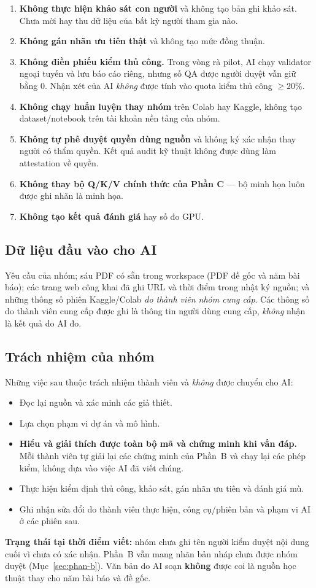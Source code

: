 \begin{enumerate}[leftmargin=2em]
\item \textbf{Không thực hiện khảo sát con người} và không tạo bản ghi khảo sát.
Chưa mời hay thu dữ liệu của bất kỳ người tham gia nào.
\item \textbf{Không gán nhãn ưu tiên thật} và không tạo mức đồng thuận.
\item \textbf{Không điền phiếu kiểm thủ công.} Trong vòng rà pilot, AI chạy
validator ngoại tuyến và lưu báo cáo riêng, nhưng số QA được người duyệt vẫn giữ
bằng $0$. Nhận xét của AI \emph{không} được tính vào quota kiểm thủ công $\ge20\%$.
\item \textbf{Không chạy huấn luyện thay nhóm} trên Colab hay Kaggle, không tạo
dataset/notebook trên tài khoản nền tảng của nhóm.
\item \textbf{Không tự phê duyệt quyền dùng nguồn} và không ký xác nhận thay người
có thẩm quyền. Kết quả audit kỹ thuật không được dùng làm attestation về quyền.
\item \textbf{Không thay bộ Q/K/V chính thức của Phần C} --- bộ minh họa luôn được
ghi nhãn là minh họa.
\item \textbf{Không tạo kết quả đánh giá} hay số đo GPU.
\end{enumerate}

\subsection{Dữ liệu đầu vào cho AI}

Yêu cầu của nhóm; sáu PDF có sẵn trong workspace (PDF đề gốc và năm bài báo); các
trang web công khai đã ghi URL và thời điểm trong nhật ký nguồn; và những thông số
phiên Kaggle/Colab \emph{do thành viên nhóm cung cấp}. Các thông số do thành viên
cung cấp được ghi là thông tin người dùng cung cấp, \emph{không} nhận là kết quả do
AI đo.

\subsection{Trách nhiệm của nhóm}

Những việc sau thuộc trách nhiệm thành viên và \emph{không} được chuyển cho AI:

\begin{itemize}[leftmargin=2em]
\item Đọc lại nguồn và xác minh các giả thiết.
\item Lựa chọn phạm vi dự án và mô hình.
\item \textbf{Hiểu và giải thích được toàn bộ mã và chứng minh khi vấn đáp.} Mỗi
thành viên tự giải lại các chứng minh của Phần~B và chạy lại các phép kiểm, không
dựa vào việc AI đã viết chúng.
\item Thực hiện kiểm định thủ công, khảo sát, gán nhãn ưu tiên và đánh giá mù.
\item Ghi nhận sửa đổi do thành viên thực hiện, công cụ/phiên bản và phạm vi AI ở
các phiên sau.
\end{itemize}

\textbf{Trạng thái tại thời điểm viết:} nhóm chưa ghi tên người kiểm duyệt nội dung
cuối vì chưa có xác nhận. Phần~B vẫn mang nhãn bản nháp chưa được nhóm duyệt
(Mục~\ref{sec:phan-b}). Văn bản do AI soạn \textbf{không} được coi là nguồn học
thuật thay cho năm bài báo và đề gốc.
